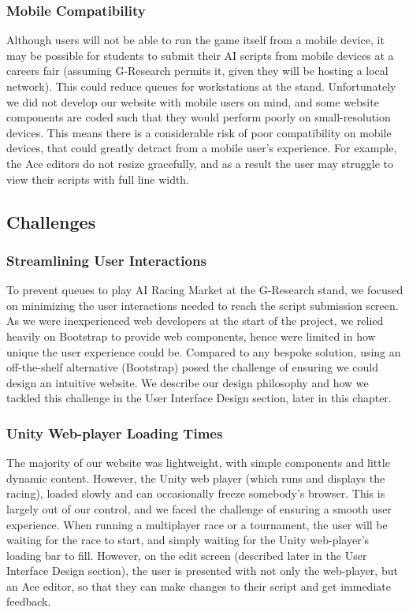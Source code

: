 \subsubsection{Mobile Compatibility}

Although users will not be able to run the game itself from a mobile device, it may be possible for students to submit their AI scripts from mobile devices at a careers fair (assuming G-Research permits it, given they will be hosting a local network). This could reduce queues for workstations at the stand. Unfortunately we did not develop our website with mobile users on mind, and some website components are coded such that they would perform poorly on small-resolution devices. This means there is a considerable risk of poor compatibility on mobile devices, that could greatly detract from a mobile user's experience. For example, the Ace editors do not resize gracefully, and as a result the user may struggle to view their scripts with full line width.

\subsection{Challenges}

\subsubsection{Streamlining User Interactions}

To prevent queues to play AI Racing Market at the G-Research stand, we focused on minimizing the user interactions needed to reach the script submission screen. As we were inexperienced web developers at the start of the project, we relied heavily on Bootstrap to provide web components, hence were limited in how unique the user experience could be. Compared to any bespoke solution, using an off-the-shelf alternative (Bootstrap) posed the challenge of ensuring we could design an intuitive website. We describe our design philosophy and how we tackled this challenge in the User Interface Design section, later in this chapter.

\subsubsection{Unity Web-player Loading Times}

The majority of our website was lightweight, with simple components and little dynamic content. However, the Unity web player (which runs and displays the racing), loaded slowly and can occasionally freeze somebody's browser. This is largely out of our control, and we faced the challenge of ensuring a smooth user experience. When running a multiplayer race or a tournament, the user will be waiting for the race to start, and simply waiting for the Unity web-player's loading bar to fill. However, on the edit screen (described later in the User Interface Design section), the user is presented with not only the web-player, but an Ace editor, so that they can make changes to their script and get immediate feedback. 

